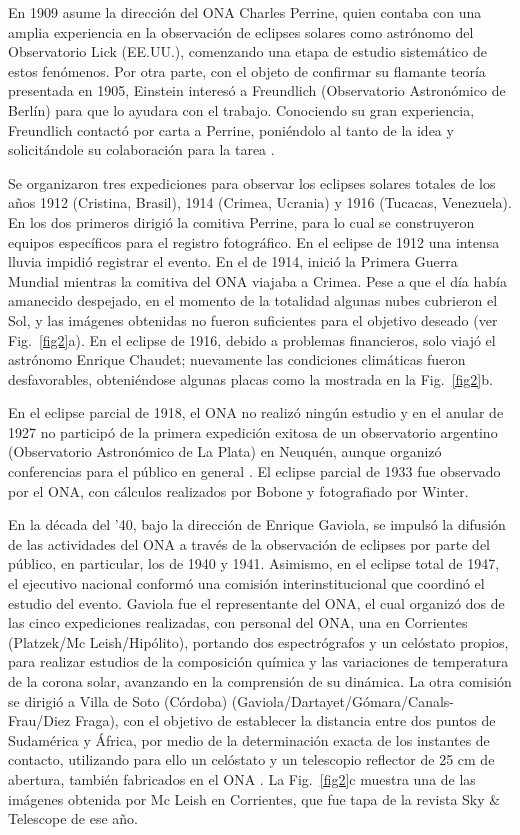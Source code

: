 \documentclass[baaa]{baaa}
\begin{document}
En 1909 asume la dirección del ONA Charles Perrine, quien contaba con una amplia experiencia en la observación de eclipses solares como astrónomo del Observatorio Lick (EE.UU.), 
comenzando una etapa de estudio sistemático de estos fenómenos. Por otra parte, con el objeto de confirmar su flamante teoría presentada en 1905, Einstein interesó a 
Freundlich (Observatorio Astronómico de Berlín) para que lo ayudara con el trabajo. Conociendo su gran experiencia, Freundlich contactó por carta a Perrine, poniéndolo al tanto
de la idea y solicitándole su colaboración para la tarea \citep{cbaestelar24}.

Se organizaron tres expediciones para observar los eclipses solares totales de los años 1912 (Cristina, Brasil), 1914 (Crimea, Ucrania) y 1916 (Tucacas, Venezuela).
En los dos primeros dirigió la comitiva Perrine, para lo cual se construyeron equipos específicos para el registro fotográfico. En el eclipse de 1912 una intensa lluvia impidió registrar
el evento. En el de 1914, inició la Primera Guerra Mundial mientras la comitiva del ONA viajaba a Crimea. Pese a que el día había amanecido despejado, en el momento de la
totalidad algunas nubes cubrieron el Sol, y las imágenes obtenidas no fueron suficientes para el objetivo deseado (ver Fig.~\ref{fig2}a).
En el eclipse de 1916, debido a problemas financieros, solo viajó el astrónomo Enrique Chaudet; nuevamente las condiciones climáticas fueron desfavorables, obteniéndose algunas
placas como la mostrada en la  Fig.~\ref{fig2}b.

En el eclipse parcial de 1918, el ONA no realizó ningún estudio y en el anular de 1927 no participó de la primera expedición exitosa de un observatorio argentino (Observatorio
Astronómico de La Plata) en Neuquén, aunque organizó conferencias para el público en general \citep{blogsp18}. El eclipse
parcial de 1933 fue observado por el ONA, con cálculos realizados por Bobone y fotografiado por Winter.
 
En la década del '40, bajo la dirección de Enrique Gaviola, se impulsó la difusión de las actividades del ONA a través de la observación de eclipses por parte del público,
en particular, los de 1940 y 1941. Asimismo, en el eclipse total de 1947, el ejecutivo nacional conformó una comisión interinstitucional que coordinó el estudio del evento.
Gaviola fue el representante del ONA, el cual organizó dos de las cinco expediciones realizadas, con personal del ONA, una en Corrientes (Platzek/Mc Leish/Hipólito), portando dos espectrógrafos
y un celóstato propios, para realizar estudios de la composición química y las variaciones de temperatura de la corona solar, avanzando en la comprensión de su dinámica.
La otra comisión se dirigió a Villa de Soto (Córdoba) (Gaviola/Dartayet/Gómara/Canals-Frau/Diez Fraga), con el objetivo de establecer la distancia entre dos puntos de
Sudamérica y África, por medio de la determinación exacta de los instantes de contacto, utilizando para ello un celóstato y un telescopio reflector de 25 cm de abertura,
también fabricados en el ONA \citep{blogsp18}. La  Fig.~\ref{fig2}c muestra una de las imágenes obtenida por Mc Leish en Corrientes, que fue tapa de la revista Sky \& Telescope de ese año.
\end{document}
